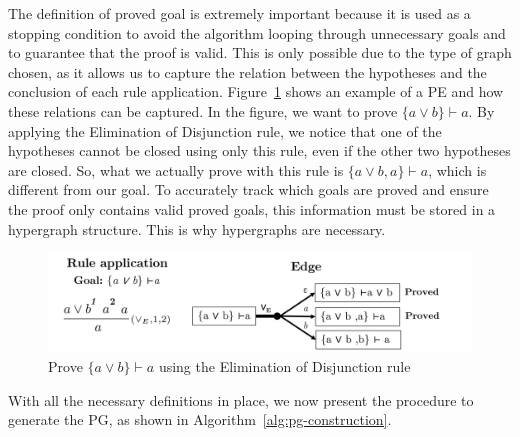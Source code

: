 The definition of proved goal is extremely important because it is used as a stopping condition to avoid the algorithm looping through unnecessary goals and to guarantee that the proof is valid. This is only possible due to the type of graph chosen, as it allows us to capture the relation between the hypotheses and the conclusion of each rule application. Figure~\ref{fig:pe-ex} shows an example of a PE and how these relations can be captured. In the figure, we want to prove \(\{a \vee b\} \vdash a\). By applying the Elimination of Disjunction rule, we notice that one of the hypotheses cannot be closed using only this rule, even if the other two hypotheses are closed. So, what we actually prove with this rule is \(\{a \vee b, a\} \vdash a\), which is different from our goal. To accurately track which goals are proved and ensure the proof only contains valid proved goals, this information must be stored in a hypergraph structure. This is why hypergraphs are necessary.

\begin{figure}[h]
    \centering
    \includegraphics[width=1\linewidth]{resources/pe-example.jpg}
    \caption{Prove \(\{a \vee b\} \vdash a\) using the Elimination of Disjunction rule}
    \label{fig:pe-ex}
\end{figure}

\vspace{1em}
With all the necessary definitions in place, we now present the procedure to generate the PG, as shown in Algorithm~\ref{alg:pg-construction}.

